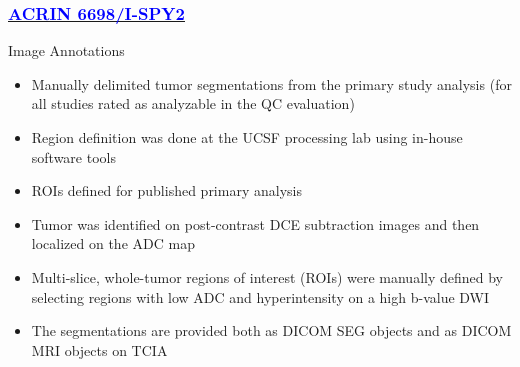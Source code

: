\documentclass{beamer}
\begin{document}
    \begin{frame}
        \frametitle{   \href{https://nbia.cancerimagingarchive.net/viewer/?study=1.3.6.1.4.1.14519.5.2.1.7695.4164.273481108061907436142425976120&series=1.3.6.1.4.1.14519.5.2.1.7695.4164.118116703802628474808498368280&token=c2744136-6276-4bb6-8111-2e85dcbda6cf}{\underline{\textcolor{blue}{ACRIN 6698/I-SPY2}}}}
        \begin{block}{Image Annotations}
            \begin{itemize}
                \item Manually delimited tumor segmentations from the primary study analysis (for all studies rated as analyzable in the QC evaluation)
                \item Region definition was done at the UCSF processing lab using in-house software tools
                \item ROIs defined for published primary analysis
                \item Tumor was identified on post-contrast DCE subtraction images and then localized on the ADC map
                \item Multi-slice, whole-tumor regions of interest (ROIs) were manually defined by selecting regions with low ADC and hyperintensity on a high b-value DWI
                \item The segmentations are provided both as DICOM SEG objects and as DICOM MRI objects on TCIA
            \end{itemize}
        \end{block}
    \end{frame}
\end{document}
